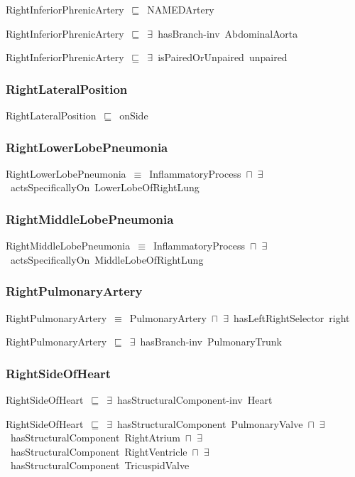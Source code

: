 \documentclass{article}
\begin{document}
RightInferiorPhrenicArtery~\ensuremath{\sqsubseteq}~NAMEDArtery~

RightInferiorPhrenicArtery~\ensuremath{\sqsubseteq}~\ensuremath{\exists}~hasBranch-inv~AbdominalAorta~

RightInferiorPhrenicArtery~\ensuremath{\sqsubseteq}~\ensuremath{\exists}~isPairedOrUnpaired~unpaired~

\subsubsection*{RightLateralPosition}

RightLateralPosition~\ensuremath{\sqsubseteq}~onSide~

\subsubsection*{RightLowerLobePneumonia}

RightLowerLobePneumonia~\ensuremath{\equiv}~InflammatoryProcess~\ensuremath{\sqcap}~\ensuremath{\exists}~actsSpecificallyOn~LowerLobeOfRightLung

\subsubsection*{RightMiddleLobePneumonia}

RightMiddleLobePneumonia~\ensuremath{\equiv}~InflammatoryProcess~\ensuremath{\sqcap}~\ensuremath{\exists}~actsSpecificallyOn~MiddleLobeOfRightLung

\subsubsection*{RightPulmonaryArtery}

RightPulmonaryArtery~\ensuremath{\equiv}~PulmonaryArtery~\ensuremath{\sqcap}~\ensuremath{\exists}~hasLeftRightSelector~right

RightPulmonaryArtery~\ensuremath{\sqsubseteq}~\ensuremath{\exists}~hasBranch-inv~PulmonaryTrunk~

\subsubsection*{RightSideOfHeart}

RightSideOfHeart~\ensuremath{\sqsubseteq}~\ensuremath{\exists}~hasStructuralComponent-inv~Heart~

RightSideOfHeart~\ensuremath{\sqsubseteq}~\ensuremath{\exists}~hasStructuralComponent~PulmonaryValve~\ensuremath{\sqcap}~\ensuremath{\exists}~hasStructuralComponent~RightAtrium~\ensuremath{\sqcap}~\ensuremath{\exists}~hasStructuralComponent~RightVentricle~\ensuremath{\sqcap}~\ensuremath{\exists}~hasStructuralComponent~TricuspidValve~
\end{document}
